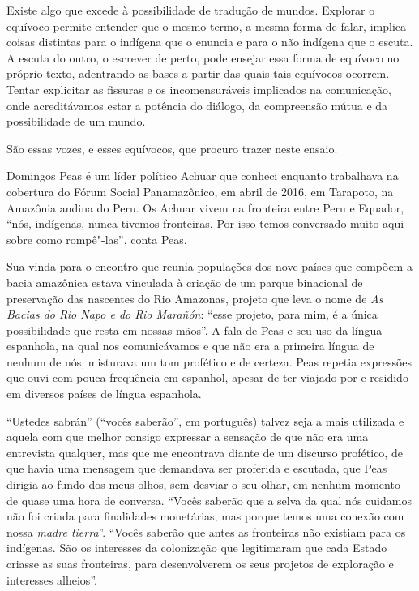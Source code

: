 Existe algo que excede à possibilidade de tradução de mundos. Explorar o
equívoco permite entender que o mesmo termo, a mesma forma de falar,
implica coisas distintas para o indígena que o enuncia e para o não indígena que
o escuta. A escuta do outro, o escrever de perto, pode ensejar essa
forma de equívoco no próprio texto, adentrando as bases a partir das
quais tais equívocos ocorrem. Tentar explicitar as fissuras e os
incomensuráveis implicados na comunicação, onde acreditávamos estar a
potência do diálogo, da compreensão mútua e da possibilidade de um
mundo.

São essas vozes, e esses equívocos, que procuro trazer neste ensaio.

\asterisc

Domingos Peas é um líder político Achuar que conheci enquanto trabalhava
na cobertura do Fórum Social Panamazônico, em abril de 2016, em
Tarapoto, na Amazônia andina do Peru. Os Achuar vivem na fronteira entre
Peru e Equador, ``nós, indígenas, nunca tivemos fronteiras. Por isso
temos conversado muito aqui sobre como rompê"-las'', conta Peas.

Sua vinda para o encontro que reunia populações dos nove países que
compõem a bacia amazônica estava vinculada à criação de um parque
binacional de preservação das nascentes do Rio Amazonas, projeto que
leva o nome de \emph{As Bacias do Rio Napo e do Rio Marañón}: ``esse
projeto, para mim, é a única possibilidade que resta em nossas mãos''. A
fala de Peas e seu uso da língua espanhola, na qual nos comunicávamos e
que não era a primeira língua de nenhum de nós, misturava um tom
profético e de certeza. Peas repetia expressões que ouvi com pouca
frequência em espanhol, apesar de ter viajado por e residido em diversos
países de língua espanhola.

``Ustedes sabrán'' (``vocês saberão'', em português) talvez seja a
mais utilizada e aquela com que melhor consigo expressar a
sensação de que não era uma entrevista qualquer, mas que me
encontrava diante de um discurso profético, de que havia uma mensagem
que demandava ser proferida e escutada, que Peas dirigia ao fundo dos
meus olhos, sem desviar o seu olhar, em nenhum momento de quase uma hora de conversa. ``Vocês saberão que a selva da
qual nós cuidamos não foi criada para finalidades monetárias, mas porque
temos uma conexão com nossa \emph{madre tierra}''. ``Vocês saberão que
antes as fronteiras não existiam para os indígenas. São os interesses da
colonização que legitimaram que cada Estado criasse as suas fronteiras,
para desenvolverem os seus projetos de exploração e interesses
alheios''.

